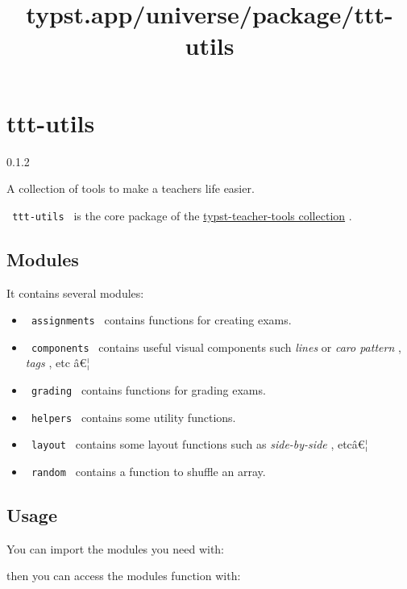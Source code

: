 \title{typst.app/universe/package/ttt-utils}

\label{banner}
\section{ttt-utils}\label{ttt-utils}

{ 0.1.2 }

A collection of tools to make a teachers life easier.

\label{readme}
\texttt{\ ttt-utils\ } is the core package of the
\href{https://github.com/jomaway/typst-teacher-templates}{typst-teacher-tools
collection} .

\subsection{Modules}\label{modules}

It contains several modules:

\begin{itemize}
\tightlist
\item
  \texttt{\ assignments\ } contains functions for creating exams.
\item
  \texttt{\ components\ } contains useful visual components such
  \emph{lines} or \emph{caro pattern} , \emph{tags} , etc â€¦
\item
  \texttt{\ grading\ } contains functions for grading exams.
\item
  \texttt{\ helpers\ } contains some utility functions.
\item
  \texttt{\ layout\ } contains some layout functions such as
  \emph{side-by-side} , etcâ€¦
\item
  \texttt{\ random\ } contains a function to shuffle an array.
\end{itemize}

\subsection{Usage}\label{usage}

You can import the modules you need with:

\begin{Shaded}
\begin{Highlighting}[]
\end{Highlighting}
\end{Shaded}

then you can access the modules function with:

